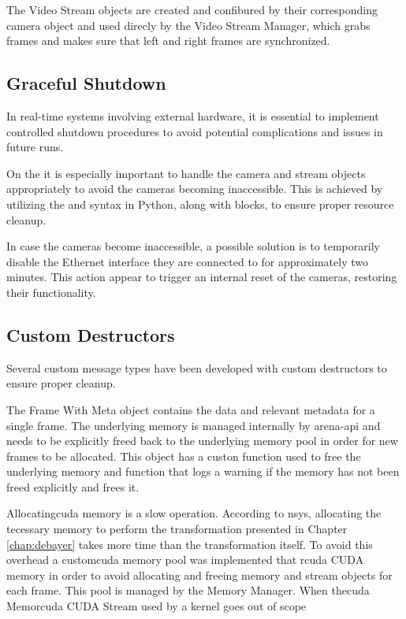 The Video Stream objects are created and confibured by their corresponding camera object and used direcly by the Video Stream Manager, which grabs frames and makes sure that left and right frames are synchronized.

\subsection{Graceful Shutdown}
In real-time systems involving external hardware, it is essential to implement controlled shutdown procedures to avoid potential complications and issues in future runs.

On the \sr it is especially important to handle the camera and stream objects appropriately to avoid the cameras becoming inaccessible.
This is achieved by utilizing the  and  syntax in Python, along with  blocks, to ensure proper resource cleanup.

In case the cameras become inaccessible, a possible solution is to temporarily disable the Ethernet interface they are connected to for approximately two minutes.
This action appear to trigger an internal reset of the cameras, restoring their functionality.

\subsection{Custom Destructors}
Several custom message types have been developed with custom destructors to ensure proper cleanup.

The Frame With Meta object contains the data and relevant metadata for a single frame.
The underlying memory is managed internally by \gls{arena-api} and needs to be explicitly freed back to the underlying memory pool in order for new frames to be allocated.
This object has a custon  function used to free the underlying memory and  function that logs a warning if the memory has not been freed explicitly and frees it.

Allocating\gls{cuda} memory is a slow operation.
According to \gls{nsys}, allocating the tecessary memory to perform the transformation presented in Chapter \ref{chap:debayer} takes more time than the transformation itself.
To avoid this overhead a custom\gls{cuda} memory pool was implemented that r\gls{cuda} CUDA memory in order to avoid allocating and freeing memory and stream objects for each frame.
This pool is managed by the Memory Manager.
When the\gls{cuda} Memor\gls{cuda} CUDA Stream used by a kernel goes out of scope

